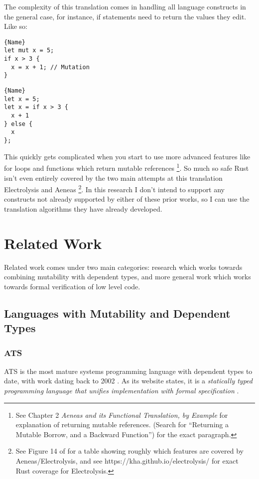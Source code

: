 \documentclass[12pt,twoside]{report}
\begin{document}
The complexity of this translation comes in handling all language constructs in the general case, for instance, if statements need to return the values they edit. Like so:

\noindent\begin{minipage}{.45\textwidth}
\begin{lstlisting}[caption=Original]{Name}
let mut x = 5;
if x > 3 {
  x = x + 1; // Mutation
}
\end{lstlisting}
\end{minipage}\hfill
\begin{minipage}{.45\textwidth}
\begin{lstlisting}[caption=Translated]{Name}
let x = 5;
let x = if x > 3 {
  x + 1
} else {
  x
};
\end{lstlisting}
\end{minipage}

This quickly gets complicated when you start to use more advanced features like for loops and functions which return mutable references \footnote{See \citep{aeneas} Chapter 2 \textit{Aeneas and its Functional Translation, by Example} for explanation of returning mutable references. (Search for ``Returning a Mutable Borrow, and a Backward Function'') for the exact paragraph.}. So much so safe Rust isn't even entirely covered by the two main attempts at this translation Electrolysis \citep{ullrich_khaelectrolysis_2024} and Aeneas \citep{aeneas} \footnote{See Figure 14 of \citep{aeneas} for a table showing roughly which features are covered by Aeneas/Electrolysis, and see https://kha.github.io/electrolysis/ for exact Rust coverage for Electrolysis.}. In this research I don't intend to support any constructs not already supported by either of these prior works, so I can use the translation algorithms they have already developed.

\section{Related Work}
Related work comes under two main categories: research which works towards combining mutability with dependent types, and more general work which works towards formal verification of low level code.

\subsection{Languages with Mutability and Dependent Types}

\subsubsection{ATS}
ATS \citep{xi_applied_2017} is the most mature systems programming language with dependent types to date, with work dating back to 2002 \citep{ATSImplements}. As its website states, it is a \textit{statically typed programming language that unifies implementation with formal specification} \citep{ATSHome}.
\end{document}
